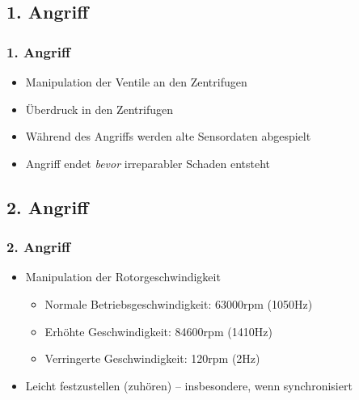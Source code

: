 \documentclass{beamer}
\begin{document}
\subsection{1. Angriff}

\begin{frame}
  \frametitle{1. Angriff}
  \begin{itemize}
    \item Manipulation der Ventile an den Zentrifugen
    \item Überdruck in den Zentrifugen
    \item Während des Angriffs werden alte Sensordaten abgespielt
    \item Angriff endet \emph{bevor} irreparabler Schaden entsteht
  \end{itemize}
\end{frame}

\subsection{2. Angriff}

\begin{frame}
  \frametitle{2. Angriff}
  \begin{itemize}
    \item Manipulation der Rotorgeschwindigkeit
      \begin{itemize}
        \item Normale Betriebsgeschwindigkeit: 63000rpm (1050Hz)
        \item Erhöhte Geschwindigkeit: 84600rpm (1410Hz)
        \item Verringerte Geschwindigkeit: 120rpm (2Hz)
      \end{itemize}
    \item Leicht festzustellen (zuhören) – insbesondere, wenn synchronisiert
  \end{itemize}
\end{frame}
\end{document}
